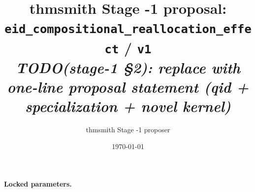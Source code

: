\documentclass[11pt]{article}
\title{thmsmith Stage -1 proposal: \texttt{eid\_compositional\_reallocation\_effect} / \texttt{v1}%
  \\ \large\textit{TODO(stage-1 \S2): replace with one-line proposal statement (qid + specialization + novel kernel)}}
\author{thmsmith Stage -1 proposer}
\date{\today}
\theoremstyle{definition}
\theoremstyle{plain}
\theoremstyle{remark}
\begin{document}
\maketitle


\paragraph{Locked parameters.}

\begin{abstract}
\end{abstract}
\end{document}
